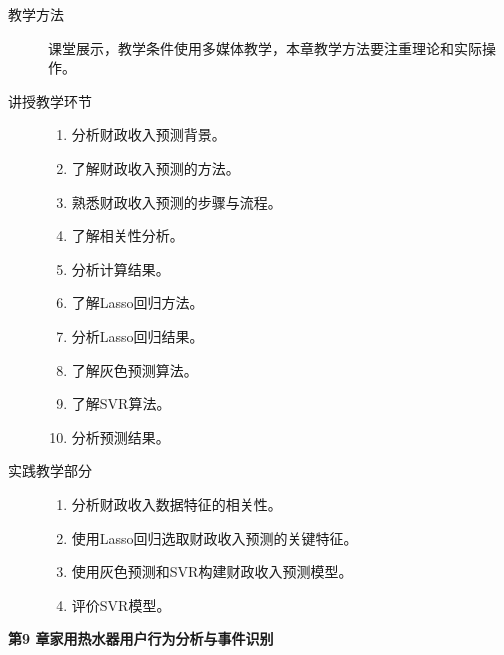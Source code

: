 \documentclass[12pt,a4paper,openany,cap]{ctexbook}
\begin{document}
\begin{description}
\item[教学方法]课堂展示，教学条件使用多媒体教学，本章教学方法要注重理论和实际操作。
\item[讲授教学环节]
  \begin{minipage}[t]{0.8\linewidth}
    \begin{enumerate}
    \item  分析财政收入预测背景。
\item\label{item:226}  了解财政收入预测的方法。
\item\label{item:227}  熟悉财政收入预测的步骤与流程。
\item\label{item:228}  了解相关性分析。
\item\label{item:229}  分析计算结果。
\item\label{item:230}  了解Lasso回归方法。
\item\label{item:231}  分析Lasso回归结果。
\item\label{item:232}  了解灰色预测算法。
\item\label{item:233}  了解SVR算法。
\item\label{item:234}  分析预测结果。
    \end{enumerate}
  \end{minipage}

\item[实践教学部分]
  \begin{minipage}[t]{0.8\linewidth}
    \begin{enumerate}
    \item  分析财政收入数据特征的相关性。
\item\label{item:235}  使用Lasso回归选取财政收入预测的关键特征。
\item\label{item:236}  使用灰色预测和SVR构建财政收入预测模型。
\item\label{item:237}  评价SVR模型。
    \end{enumerate}
  \end{minipage}

  
\end{description}

\begin{center}
   \textbf{第9 章\quad 家用热水器用户行为分析与事件识别}
\end{center}
\end{document}
